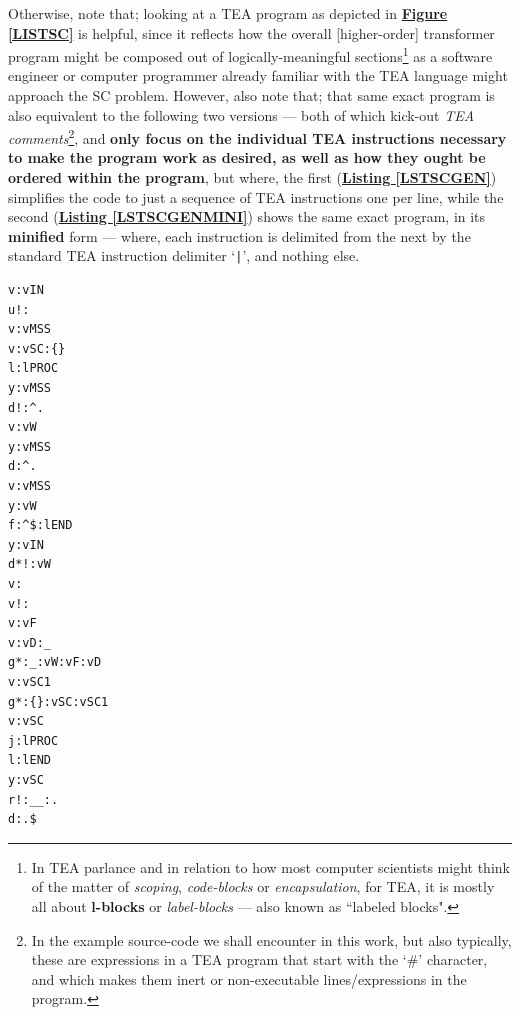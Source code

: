 \documentclass[a4paper, 18pt]{book} %
\begin{document}
Otherwise, note that; looking at a TEA program as depicted in \textbf{\hyperref[LISTSC]{Figure \ref{LISTSC}}} is helpful, since it reflects how the overall [higher-order] transformer program might be composed out of logically-meaningful sections\footnote{In TEA parlance and in relation to how most computer scientists might think of the matter of \textit{scoping}, \textit{code-blocks} or \textit{encapsulation}, for TEA, it is mostly all about \textbf{l-blocks} or \textit{label-blocks} --- also known as ``labeled blocks"\cite{Lutalo2024TEATAZ}.} as a software engineer or computer programmer already familiar with the TEA language might approach the SC problem. However, also note that; that same exact program is also equivalent to the following two versions --- both of which kick-out \textit{TEA comments}\footnote{In the example source-code we shall encounter in this work, but also typically, these are expressions in a TEA program that start with the `\#' character, and which makes them inert or non-executable lines/expressions in the program.}, and \textbf{only focus on the individual TEA instructions necessary to make the program work as desired, as well as how they ought be ordered within the program}, but where, the first (\textbf{\hyperref[LSTSCGEN]{Listing \ref{LSTSCGEN}}}) simplifies the code to just a sequence of TEA instructions one per line, while the second (\textbf{\hyperref[LSTSCGEN]{Listing \ref{LSTSCGENMINI}}}) shows the same exact program, in its \textbf{minified} form --- where, each instruction is delimited from the next by the standard TEA instruction delimiter `\verb!|!', and nothing else.

\vspace{2em}

  \begin{tcolorbox}[teaterminalstyle, title=TEA Program: SC-Generator, breakable]
  \begin{lstlisting}[language=TEA, label={LSTSCGEN}, ]
v:vIN
u!:
v:vMSS
v:vSC:{}
l:lPROC
y:vMSS
d!:^.
v:vW
y:vMSS
d:^.
v:vMSS
y:vW
f:^$:lEND
y:vIN
d*!:vW
v:
v!:
v:vF
v:vD:_
g*:_:vW:vF:vD
v:vSC1
g*:{}:vSC:vSC1
v:vSC
j:lPROC
l:lEND
y:vSC
r!:__:.
d:.$
   \end{lstlisting}
  \end{tcolorbox}
  \vspace{2em}
\end{document}
